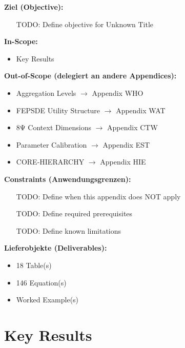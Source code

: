 \begin{tcolorbox}[
    colback=orange!5!white,
    colframe=orange!75!black,
    title={\textbf{Appendix Scope: Ziel / In-Scope / Out-of-Scope / Constraints}},
    fonttitle=\bfseries
]

\textbf{Ziel (Objective):}
\begin{itemize}[nosep]
    \item [TODO: Define objective for Unknown Title]
\end{itemize}

\textbf{In-Scope:}
\begin{itemize}[nosep]
    \item Key Results
\end{itemize}

\textbf{Out-of-Scope (delegiert an andere Appendices):}
\begin{itemize}[nosep]
    \item Aggregation Levels $\rightarrow$ Appendix WHO
    \item FEPSDE Utility Structure $\rightarrow$ Appendix WAT
    \item 8Ψ Context Dimensions $\rightarrow$ Appendix CTW
    \item Parameter Calibration $\rightarrow$ Appendix EST
    \item CORE-HIERARCHY $\rightarrow$ Appendix HIE
\end{itemize}

\textbf{Constraints (Anwendungsgrenzen):}
\begin{itemize}[nosep]
    \item [TODO: Define when this appendix does NOT apply]
    \item [TODO: Define required prerequisites]
    \item [TODO: Define known limitations]
\end{itemize}

\textbf{Lieferobjekte (Deliverables):}
\begin{itemize}[nosep]
    \item 18 Table(s)
    \item 146 Equation(s)
    \item Worked Example(s)
\end{itemize}

\end{tcolorbox}


\section{Key Results}
\label{sec:B-key-results}

